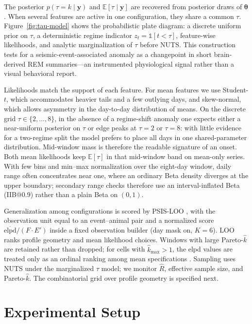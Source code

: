 The posterior \(p(\tau{=}k\mid\mathbf{y})\) and \(\mathbb{E}[\tau\mid\mathbf{y}]\) are recovered from posterior draws of \(\boldsymbol{\theta}\). When several features are active in one configuration, they share a common \(\tau\). Figure~\ref{fig:tau-model} shows the probabilistic plate diagram: a discrete uniform prior on \(\tau\), a deterministic regime indicator \(z_t=\mathbb{1}[t<\tau]\), feature-wise likelihoods, and analytic marginalization of \(\tau\) before NUTS. This construction tests for a seismic-event-associated anomaly as a changepoint in short brain-derived REM summaries—an instrumented physiological signal rather than a visual behavioral report.

Likelihoods match the support of each feature. For mean features we use Student-\(t\), which accommodates heavier tails and a few outlying days, and skew-normal, which allows asymmetry in the day-to-day distribution of means. On the discrete grid \(\tau\in\{2,\ldots,8\}\), in the absence of a regime-shift anomaly one expects either a near-uniform posterior on \(\tau\) or edge peaks at \(\tau=2\) or \(\tau=8\): with little evidence for a two-regime split the model prefers to place all days in one shared-parameter distribution. Mid-window mass is therefore the readable signature of an onset. Both mean likelihoods keep \(\mathbb{E}[\tau]\) in that mid-window band on mean-only series. With few bins and min–max normalization over the eight-day window, daily range often concentrates near one, where an ordinary Beta density diverges at the upper boundary; secondary range checks therefore use an interval-inflated Beta (IIB@\(0.9\)) rather than a plain Beta on \((0,1)\).

Generalization among configurations is scored by PSIS-LOO \cite{Vehtari2017,Vehtari2024}, with the observation unit equal to an event–animal pair and a normalized score \(\overline{\mathrm{elpd}}/(F\cdot E')\) inside a fixed observation builder (day mask on, \(K=6\)). LOO ranks profile geometry and mean likelihood choices. Windows with large Pareto-\(\hat k\) are retained rather than dropped; for cells with \(\hat k_{\max}>1\), the elpd values are treated only as an ordinal ranking among mean specifications \cite{Vehtari2024}. Sampling uses NUTS under the marginalized \(\tau\) model; we monitor \(\hat R\), effective sample size, and Pareto-\(\hat k\). The combinatorial grid over profile geometry is specified next.

\section{Experimental Setup}

